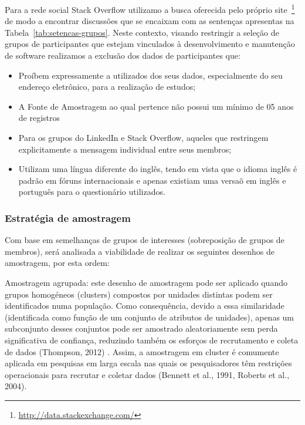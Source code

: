 \begin{table}[htb]
\centering
{}
\label{tab:setencas-grupos}
\end{table}


Para a rede social Stack Overflow utilizamo a busca oferecida pelo próprio
site~\footnote{\url{http://data.stackexchange.com/}} de modo a encontrar
discussões que se encaixam com as sentenças apresentas na
Tabela~\ref{tab:setencas-grupos}. Neste contexto, visando restringir a seleção
de grupos de participantes que estejam vinculados à desenvolvimento e manutenção
de software realizamos a exclusão dos dados de participantes que:
\begin{itemize}
	\item Proíbem expressamente a utilizados dos seus dados, especialmente do seu endereço
		eletrônico, para a realização de estudos;
	\item A Fonte de Amostragem ao qual pertence não possui um mínimo de 05 anos
		de registros
	\item Para os grupos do LinkedIn e Stack Overflow, aqueles que restringem
		explicitamente a mensagem individual entre seus membros;
    \item Utilizam uma língua diferente do inglês, tendo em vista que o idioma
		inglês é padrão em fóruns internacionais e apenas existiam uma versaõ em
		inglês e português para o questionário utilizados.
\end{itemize}

\subsubsection{Estratégia de amostragem}

Com base em semelhanças de grupos de interesses (sobreposição de grupos de
membros), será analisada a viabilidade de realizar os seguintes desenhos de
amostragem, por esta ordem:

Amostragem agrupada: este desenho de amostragem pode ser aplicado quando grupos
homogéneos (clusters) compostos por unidades distintas podem ser identificados
numa população. Como consequência, devido a essa similaridade (identificada como
função de um conjunto de atributos de unidades), apenas um subconjunto desses
conjuntos pode ser amostrado aleatoriamente sem perda significativa de
confiança, reduzindo também os esforços de recrutamento e coleta de dados
(Thompson, 2012) . Assim, a amostragem em cluster é comumente aplicada em
pesquisas em larga escala nas quais os pesquisadores têm restrições operacionais
para recrutar e coletar dados (Bennett et al., 1991, Roberts et al., 2004).

